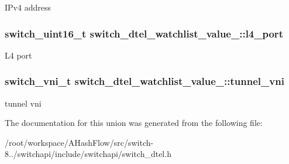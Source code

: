 I\+Pv4 address \hypertarget{unionswitch__dtel__watchlist__value___a10ce4486b1fe3b42da1f5bc43c19438f}{
\subsubsection[{l4\+\_\+port}]{\setlength{\rightskip}{0pt plus 5cm}switch\+\_\+uint16\+\_\+t switch\+\_\+dtel\+\_\+watchlist\+\_\+value\+\_\+\+::l4\+\_\+port}}\label{unionswitch__dtel__watchlist__value___a10ce4486b1fe3b42da1f5bc43c19438f}
L4 port \hypertarget{unionswitch__dtel__watchlist__value___a2964f13afb2b7837f86ba8cf1d394c7a}{
\subsubsection[{tunnel\+\_\+vni}]{\setlength{\rightskip}{0pt plus 5cm}switch\+\_\+vni\+\_\+t switch\+\_\+dtel\+\_\+watchlist\+\_\+value\+\_\+\+::tunnel\+\_\+vni}}\label{unionswitch__dtel__watchlist__value___a2964f13afb2b7837f86ba8cf1d394c7a}
tunnel vni 

The documentation for this union was generated from the following file\+:\begin{DoxyCompactItemize}
\item 
/root/workspace/\+A\+Hash\+Flow/src/switch-\/8../switchapi/include/switchapi/switch\+\_\+dtel.\+h\end{DoxyCompactItemize}
